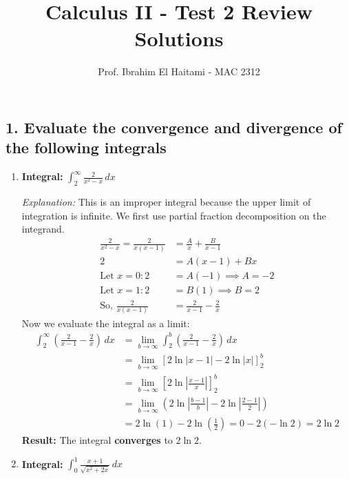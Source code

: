 \documentclass[12pt]{article}
\newcommand{\questiontitle}[1]{\subsection*{#1}}
\begin{document}
\title{\textbf{Calculus II - Test 2 Review Solutions}}
\author{Prof. Ibrahim El Haitami - MAC 2312}
\date{}
\maketitle

\hrulefill
\vspace{1em}

\questiontitle{1. Evaluate the convergence and divergence of the following integrals}

\begin{enumerate}[label=\alph*.]
    \item \textbf{Integral: } $\displaystyle \int_{2}^{\infty} \frac{2}{x^2 - x} \,dx$
    
    \textit{Explanation:} This is an improper integral because the upper limit of integration is infinite. We first use partial fraction decomposition on the integrand.
    \begin{align*}
        \frac{2}{x^2 - x} = \frac{2}{x(x-1)} &= \frac{A}{x} + \frac{B}{x-1} \\
        2 &= A(x-1) + Bx \\
        \text{Let } x=0: 2 &= A(-1) \implies A = -2 \\
        \text{Let } x=1: 2 &= B(1) \implies B = 2 \\
        \text{So, } \frac{2}{x(x-1)} &= \frac{2}{x-1} - \frac{2}{x}
    \end{align*}
    Now we evaluate the integral as a limit:
    \begin{align*}
        \int_{2}^{\infty} \left(\frac{2}{x-1} - \frac{2}{x}\right) \,dx &= \lim_{b \to \infty} \int_{2}^{b} \left(\frac{2}{x-1} - \frac{2}{x}\right) \,dx \\
        &= \lim_{b \to \infty} \left[ 2\ln|x-1| - 2\ln|x| \right]_{2}^{b} \\
        &= \lim_{b \to \infty} \left[ 2\ln\left|\frac{x-1}{x}\right| \right]_{2}^{b} \\
        &= \lim_{b \to \infty} \left( 2\ln\left|\frac{b-1}{b}\right| - 2\ln\left|\frac{2-1}{2}\right| \right) \\
        &= 2\ln(1) - 2\ln\left(\frac{1}{2}\right) = 0 - 2(-\ln 2) = 2\ln 2
    \end{align*}
    \textbf{Result:} The integral \textbf{converges} to $2\ln 2$.

    \item \textbf{Integral: } $\displaystyle \int_{0}^{1} \frac{x+1}{\sqrt{x^2 + 2x}} \,dx$
    

\end{enumerate}
\end{document}
